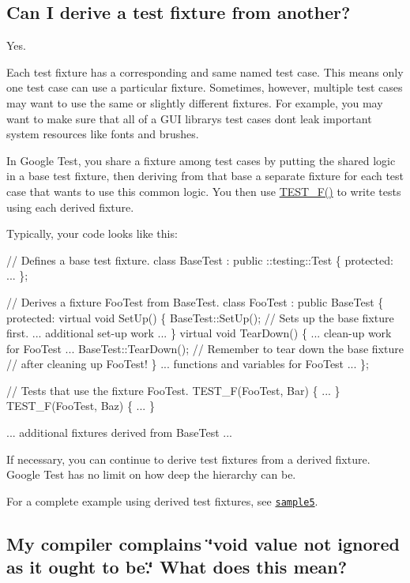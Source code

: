 \subsection*{Can I derive a test fixture from another?}

Yes.

Each test fixture has a corresponding and same named test case. This means only one test case can use a particular fixture. Sometimes, however, multiple test cases may want to use the same or slightly different fixtures. For example, you may want to make sure that all of a G\+UI library\textquotesingle{}s test cases don\textquotesingle{}t leak important system resources like fonts and brushes.

In Google Test, you share a fixture among test cases by putting the shared logic in a base test fixture, then deriving from that base a separate fixture for each test case that wants to use this common logic. You then use {\ttfamily \hyperlink{gtest_8h_a0ee66d464d1a06c20c1929cae09d8758}{T\+E\+S\+T\+\_\+\+F()}} to write tests using each derived fixture.

Typically, your code looks like this\+:


\begin{DoxyCode}
// Defines a base test fixture.
class BaseTest : public ::testing::Test \{
  protected:
   ...
\};

// Derives a fixture FooTest from BaseTest.
class FooTest : public BaseTest \{
  protected:
    virtual void SetUp() \{
      BaseTest::SetUp();  // Sets up the base fixture first.
      ... additional set-up work ...
    \}
    virtual void TearDown() \{
      ... clean-up work for FooTest ...
      BaseTest::TearDown();  // Remember to tear down the base fixture
                             // after cleaning up FooTest!
    \}
    ... functions and variables for FooTest ...
\};

// Tests that use the fixture FooTest.
TEST\_F(FooTest, Bar) \{ ... \}
TEST\_F(FooTest, Baz) \{ ... \}

... additional fixtures derived from BaseTest ...
\end{DoxyCode}


If necessary, you can continue to derive test fixtures from a derived fixture. Google Test has no limit on how deep the hierarchy can be.

For a complete example using derived test fixtures, see \href{../samples/sample5_unittest.cc}{\tt sample5}.

\subsection*{My compiler complains \char`\"{}void value not ignored as it ought to be.\char`\"{} What does this mean?}

